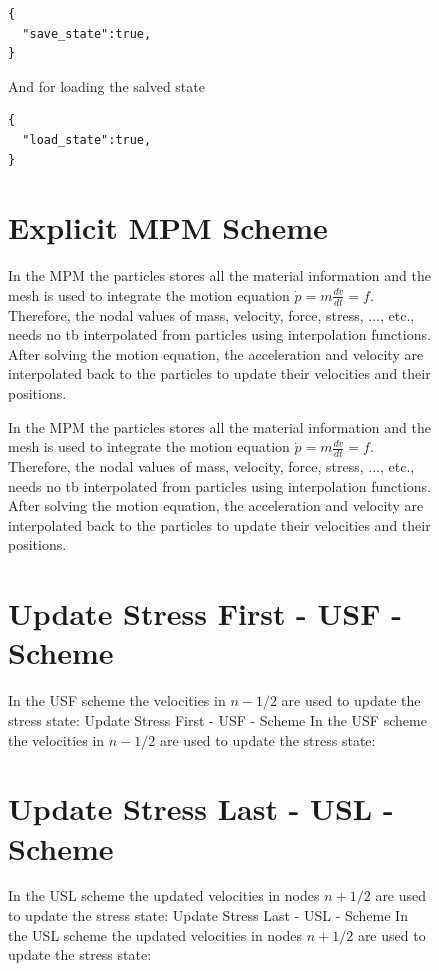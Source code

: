 \documentclass[11pt,a4paper]{article}
\begin{document}
\begin{figure}[h]
\begin{lstlisting}[language={},caption={input JSON}]
{
  "save_state":true,
}
\end{lstlisting}


And for loading the salved state

\begin{lstlisting}[language={},caption={input JSON}]
{
  "load_state":true,
}
\end{lstlisting}


\section{Explicit MPM Scheme}

In the MPM the particles stores all the material information and the mesh is used to integrate the motion equation $ \dot{p} = m \frac{dv}{dt} = f $. Therefore, the nodal values of mass, velocity, force, stress, ..., etc., needs no tb interpolated from particles using interpolation functions. After solving the motion equation, the acceleration and velocity are interpolated back to the particles to update their velocities and their positions.

In the MPM the particles stores all the material information and the mesh is used to integrate the motion equation $ \dot{p} = m \frac{dv}{dt} = f $. Therefore, the nodal values of mass, velocity, force, stress, ..., etc., needs no tb interpolated from particles using interpolation functions. After solving the motion equation, the acceleration and velocity are interpolated back to the particles to update their velocities and their positions.

\section{Update Stress First - USF - Scheme}
In the USF scheme the velocities in  $ n-1/2  $ are used to update the stress state:
Update Stress First - USF - Scheme
In the USF scheme the velocities in  $ n-1/2  $ are used to update the stress state:

\section{Update Stress Last - USL - Scheme}
In the USL scheme the updated velocities in nodes  $ n+1/2  $ are used to update the stress state:
Update Stress Last - USL - Scheme
In the USL scheme the updated velocities in nodes  $ n+1/2  $ are used to update the stress state:


\end{figure}
\end{document}
